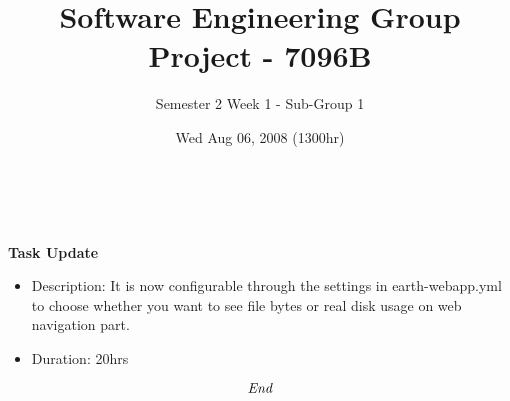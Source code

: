 \documentclass[10pt, a4]{article}
\begin{document}
 
\title{Software Engineering Group Project - 7096B}
\author{Semester 2 Week 1 - Sub-Group 1}
\date{Wed Aug 06, 2008 (1300hr)}
 
\maketitle 
 

\\

\\

\noindent \textbf{Task Update}
\begin{itemize}
\item Description: It is now configurable through the settings in earth-webapp.yml to choose whether you want to see file bytes or real disk usage on web navigation part.
\item Duration: 20hrs
\end{itemize}

\[\emph{End}\]
 
\end{document}
